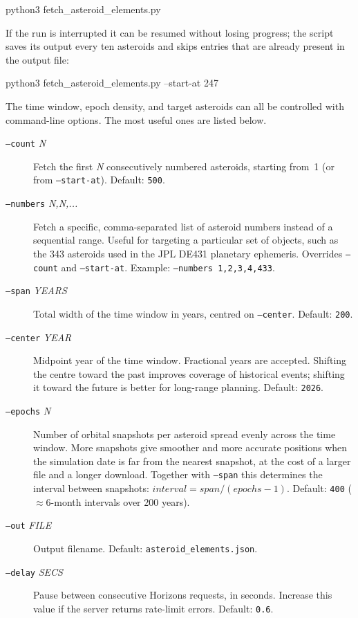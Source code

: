 \begin{commands}
python3 fetch_asteroid_elements.py
\end{commands}
 
\noindent If the run is interrupted it can be resumed without losing
progress; the script saves its output every ten asteroids and skips
entries that are already present in the output file:
 
\begin{commands}
python3 fetch_asteroid_elements.py --start-at 247
\end{commands}
 
\noindent The time window, epoch density, and target asteroids can all
be controlled with command-line options.  The most useful ones are
listed below.
 
\begin{description}
\item[\texttt{--count} \textit{N}] Fetch the first \textit{N}
  consecutively numbered asteroids, starting from~1 (or from
  \texttt{--start-at}).  Default: \texttt{500}.
 
\item[\texttt{--numbers} \textit{N,N,...}] Fetch a specific,
  comma-separated list of asteroid numbers instead of a sequential
  range.  Useful for targeting a particular set of objects, such as the
  343 asteroids used in the JPL DE431 planetary ephemeris.  Overrides
  \texttt{--count} and \texttt{--start-at}.  Example:
  \texttt{--numbers 1,2,3,4,433}.
 
\item[\texttt{--span} \textit{YEARS}] Total width of the time window in
  years, centred on \texttt{--center}.  Default: \texttt{200}.
 
\item[\texttt{--center} \textit{YEAR}] Midpoint year of the time
  window.  Fractional years are accepted.  Shifting the centre toward
  the past improves coverage of historical events; shifting it toward
  the future is better for long-range planning.  Default: \texttt{2026}.
 
\item[\texttt{--epochs} \textit{N}] Number of orbital snapshots per
  asteroid spread evenly across the time window.  More snapshots give
  smoother and more accurate positions when the simulation date is far
  from the nearest snapshot, at the cost of a larger file and a longer
  download.  Together with \texttt{--span} this determines the interval
  between snapshots: $\mathit{interval} = \mathit{span} /
  (\mathit{epochs} - 1)$.  Default: \texttt{400}
  (${\approx}$6-month intervals over 200 years).
 
\item[\texttt{--out} \textit{FILE}] Output filename.  Default:
  \texttt{asteroid\_elements.json}.
 
\item[\texttt{--delay} \textit{SECS}] Pause between consecutive
  Horizons requests, in seconds.  Increase this value if the server
  returns rate-limit errors.  Default: \texttt{0.6}.
\end{description}
 
